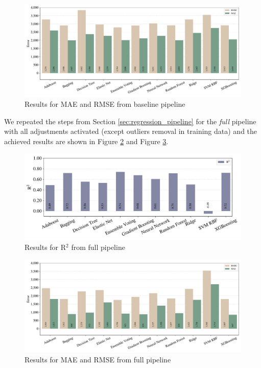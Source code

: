 \begin{figure}[!htb]
  \centering
  \caption{Results for MAE and RMSE from baseline pipeline}
  \label{fig:results_base_case_error}
  \includegraphics[width=\textwidth]{images/chapters/results_regression_all_off_mae_rmse_test.pdf}
\end{figure}

We repeated the steps from Section \ref{sec:regression_pipeline} for the \textit{full} pipeline with all adjustments activated (except outliers removal in training data) and the achieved results are shown in Figure \ref{fig:results_full_pipeline_r2} and Figure \ref{fig:results_full_pipeline_error}.

\begin{figure}[htb]
  \centering
  \caption{Results for R$^2$ from full pipeline}
  \label{fig:results_full_pipeline_r2}
  \includegraphics[width=\textwidth]{images/chapters/results_regression_all_set_r2.pdf}
\end{figure}

\begin{figure}[htb]
  \centering
  \caption{Results for MAE and RMSE from full pipeline}
  \label{fig:results_full_pipeline_error}
  \includegraphics[width=\textwidth]{images/chapters/results_regression_all_set_mae_rmse_test.pdf}
\end{figure}

